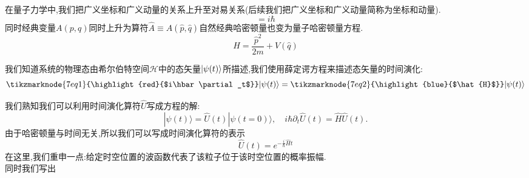 在量子力学中,我们把广义坐标和广义动量的关系上升至对易关系(后续我们把广义坐标和广义动量简称为坐标和动量).
\begin{equation}
    [\hat{q},\hat{p}]=i\hbar
\end{equation}
同时经典变量$A(p,q)$同时上升为算符$\hat{A}\equiv A(\hat{p},\hat{q})$自然经典哈密顿量也变为量子哈密顿量方程.
\begin{equation}
    \hat{H}=\frac{\hat{p}^2}{2m}+V(\hat{q})
\end{equation}


我们知道系统的物理态由希尔伯特空间$ \mathcal H $中的态矢量$|\psi(t)\rangle$所描述,我们使用薛定谔方程来描述态矢量的时间演化:\\

\begin{equation}
    \vspace{\baselineskip}
    \tikzmarknode{7eq1}{\highlight{red}{$i\hbar\partial_t$}}|\psi(t)\rangle=\tikzmarknode{7eq2}{\highlight{blue}{$\hat{H}$}}|\psi(t)\rangle
\end{equation}

我们熟知我们可以利用时间演化算符$\hat U$写成方程的解:
\begin{equation}
    |\psi(t)\rangle=\hat{U}(t)|\psi(t=0)\rangle,\quad i\hbar\partial_t\hat{U}(t)=\hat{H}\hat{U}(t).
\end{equation}
由于哈密顿量与时间无关,所以我们可以写成时间演化算符的表示
\begin{equation}
    \hat{U}(t)=e^{-\frac i\hbar\hat{H}t}
\end{equation}
在这里,我们重申一点:给定时空位置的波函数代表了该粒子位于该时空位置的概率振幅.\\
同时我们写出\\\\\\

